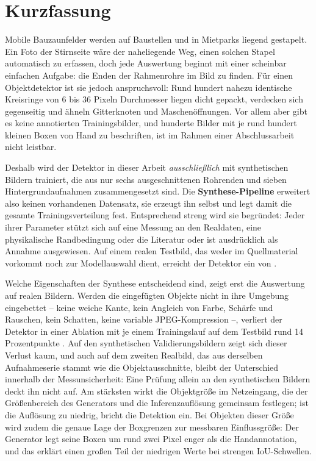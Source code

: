 \chapter*{Kurzfassung}
\thispagestyle{plain}

Mobile Bauzaunfelder werden auf Baustellen und in Mietparks liegend gestapelt.
Ein Foto der Stirnseite wäre der naheliegende Weg, einen solchen Stapel
automatisch zu erfassen, doch jede Auswertung beginnt mit einer scheinbar
einfachen Aufgabe: die Enden der Rahmenrohre im Bild zu finden. Für einen
Objektdetektor ist sie jedoch anspruchsvoll: Rund hundert nahezu identische
Kreisringe von 6 bis 36 Pixeln Durchmesser liegen dicht gepackt, verdecken sich
gegenseitig und ähneln Gitterknoten und Maschenöffnungen. Vor allem aber gibt
es keine annotierten Trainingsbilder, und hunderte Bilder mit je rund hundert
kleinen Boxen von Hand zu beschriften, ist im Rahmen einer
Abschlussarbeit nicht leistbar.

Deshalb wird der Detektor in dieser Arbeit \emph{ausschließlich} mit
synthetischen Bildern trainiert, die aus nur sechs ausgeschnittenen Rohrenden
und sieben Hintergrundaufnahmen zusammengesetzt sind. Die
\textbf{Synthese-Pipeline} erweitert also keinen vorhandenen Datensatz, sie
erzeugt ihn selbst und legt damit die gesamte Trainingsverteilung fest.
Entsprechend streng wird sie begründet: Jeder ihrer
Parameter stützt sich auf eine Messung an den Realdaten, eine physikalische
Randbedingung oder die Literatur oder ist ausdrücklich als Annahme ausgewiesen.
Auf einem realen Testbild, das weder im Quellmaterial vorkommt noch zur
Modellauswahl dient, erreicht der Detektor ein \mAPfifty{} von
\textbf{\zrefTestMap}.

Welche Eigenschaften der Synthese entscheidend sind, zeigt erst die Auswertung
auf realen Bildern.
Werden die eingefügten Objekte nicht in ihre Umgebung eingebettet -- keine
weiche Kante, kein Angleich von Farbe, Schärfe und Rauschen, kein Schatten,
keine variable JPEG-Kompression --, verliert der Detektor in einer Ablation mit
je einem Trainingslauf auf dem Testbild rund 14 Prozentpunkte \mAPfifty{}. Auf
den synthetischen Validierungsbildern zeigt sich dieser Verlust kaum, und auch
auf dem zweiten Realbild, das aus derselben Aufnahmeserie stammt wie die
Objektausschnitte, bleibt der Unterschied innerhalb der Messunsicherheit: Eine
Prüfung allein an den synthetischen Bildern deckt ihn nicht auf.
Am stärksten wirkt die Objektgröße im Netzeingang, die der Größenbereich des
Generators und die Inferenzauflösung gemeinsam festlegen; ist die Auflösung zu
niedrig, bricht die Detektion ein. Bei Objekten dieser Größe wird zudem die
genaue Lage der Boxgrenzen zur messbaren Einflussgröße: Der
Generator legt seine Boxen um rund zwei Pixel enger als die Handannotation, und
das erklärt einen großen Teil der niedrigen Werte bei strengen IoU-Schwellen.
